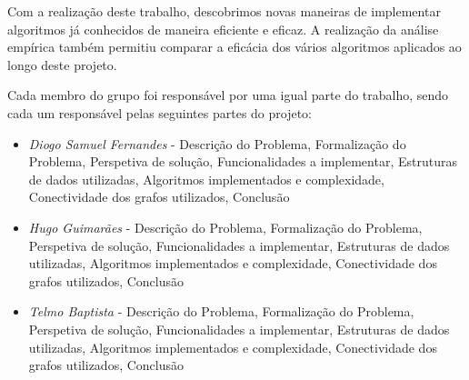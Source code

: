 \documentclass[article, a4paper, 12pt, oneside]{memoir}
\begin{document}
Com a realização deste trabalho, descobrimos novas maneiras de implementar algoritmos já conhecidos de maneira eficiente e eficaz. A realização da análise empírica também permitiu comparar a eficácia dos vários algoritmos aplicados ao longo deste projeto.

Cada membro do grupo foi responsável por uma igual parte do trabalho, sendo cada um responsável pelas seguintes partes do projeto:
\begin{itemize}
	\item\emph{ Diogo Samuel Fernandes} - Descrição do Problema, Formalização do Problema, Perspetiva de solução, Funcionalidades a implementar, Estruturas de dados utilizadas, Algoritmos implementados e complexidade, Conectividade dos grafos utilizados, Conclusão
	\item\emph{ Hugo Guimarães} - Descrição do Problema, Formalização do Problema, Perspetiva de solução, Funcionalidades a implementar, Estruturas de dados utilizadas, Algoritmos implementados e complexidade, Conectividade dos grafos utilizados, Conclusão
	\item\emph{ Telmo Baptista} - Descrição do Problema, Formalização do Problema, Perspetiva de solução, Funcionalidades a implementar, Estruturas de dados utilizadas, Algoritmos implementados e complexidade, Conectividade dos grafos utilizados, Conclusão
\end{itemize}

\newpage
\end{document}
